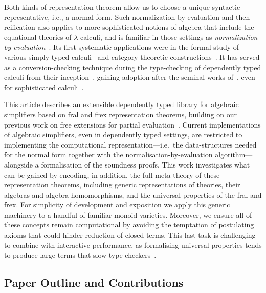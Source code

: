 Both kinds of representation theorem allow us to choose a unique
syntactic representative, i.e., a normal form.
Such normalization by evaluation and then reification
also applies to more sophisticated notions of algebra that include the
equational theories of $\lambda$-calculi, and is familiar in those
settings as \emph{normalization-by-evaluation}~\cite{berger:nbe}.  Its first systematic
applications were in the formal study of various simply typed
calculi~\cite{altenkirch-et-al:cat-reconstruction,%
  cubric-dybjer-scott:normalization-and-the-yoneda-embedding,%
  altenkirch-et-al:nbe-stlc-sums}
and category theoretic
constructions~\cite{beylin-dybjer:extracting-coherence-for-monoidal-cats}.
It has served as a conversion-checking technique during the
type-checking of dependently typed calculi from their
inception~\cite{martin-lof:an-intuitionistic-theory-of-types},
gaining adoption after the seminal works
of~\citet{abel-aehlig-dybjer:nbe-ml-tt-universe,abel-coquand-dybjer:nbe-mltt-eq},
even for sophisticated
calculi~\cite{DBLP:journals/pacmpl/0001VW17,sterling-angiuli:normalization-for-cubical-type-theory,DBLP:journals/jfp/HuJP23}.

This article describes an extensible dependently typed library for
algebraic simplifiers based on fral and frex representation theorems,
building on our previous work on free extensions for
partial evaluation~\cite{yallop-et-al:partially-static-data-as-frex}.
%
Current implementations of algebraic simplifiers,
even in dependently typed settings, are restricted to
implementing the computational representation---i.e.~the data-structures
needed for the normal form together with the
normalisation-by-evaluation algorithm---alongside a formalisation of
the soundness proofs.
%
This work investigates what can be gained by encoding, in addition,
the full meta-theory of these representation
theorems, including generic representations of theories, their
algebras and algebra homomorphisms, and the universal properties of
the fral and frex.
%
For simplicity of development and exposition we apply this generic
machinery to a handful of familiar monoid varieties.
%
Moreover, we ensure all of these concepts remain computational by avoiding
the temptation of postulating axioms that could hinder reduction of closed
terms.
This last task is challenging to combine with
interactive performance, as formalising universal properties tends to
produce large terms that slow
type-checkers~\cite{gross-chlipala-spivak:performant-cat-theory-in-coq}.


\subsection{Paper Outline and Contributions}

